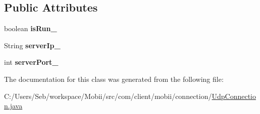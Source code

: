 \subsection*{Public Attributes}
\begin{DoxyCompactItemize}
\item 
\hypertarget{classcom_1_1client_1_1mobii_1_1connection_1_1_udp_connection_a41d0d61b2f9c9caa36289c4bc16d6d70}{boolean {\bfseries is\-Run\-\_\-}}\label{classcom_1_1client_1_1mobii_1_1connection_1_1_udp_connection_a41d0d61b2f9c9caa36289c4bc16d6d70}

\item 
\hypertarget{classcom_1_1client_1_1mobii_1_1connection_1_1_udp_connection_a692bca1f62b66d454c30a975bce186a8}{String {\bfseries server\-Ip\-\_\-}}\label{classcom_1_1client_1_1mobii_1_1connection_1_1_udp_connection_a692bca1f62b66d454c30a975bce186a8}

\item 
\hypertarget{classcom_1_1client_1_1mobii_1_1connection_1_1_udp_connection_a9a45f69dd5aa91c635793cf6b0a0b58f}{int {\bfseries server\-Port\-\_\-}}\label{classcom_1_1client_1_1mobii_1_1connection_1_1_udp_connection_a9a45f69dd5aa91c635793cf6b0a0b58f}

\end{DoxyCompactItemize}


The documentation for this class was generated from the following file\-:\begin{DoxyCompactItemize}
\item 
C\-:/\-Users/\-Seb/workspace/\-Mobii/src/com/client/mobii/connection/\hyperlink{_udp_connection_8java}{Udp\-Connection.\-java}\end{DoxyCompactItemize}
